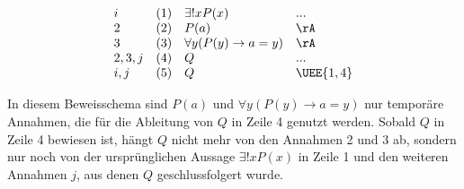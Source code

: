 \documentclass{book}
\theoremstyle{plain}
\theoremstyle{remark}
\theoremstyle{definition}
\begin{document}
\[
\begin{array}{llll}
    i      & (1) & \exists! x P(x)                                  & ...\\
    2      & (2) & P(a)                                             & \rA\\
    3      & (3) & \forall y (P(y) \rightarrow a = y)               & \rA\\
    2,3,j  & (4) & Q                                                & ...\\
    i,j    & (5) & Q                                                & \UEE{1,4}\\
\end{array}
\]

In diesem Beweisschema sind \(P(a)\) und \(\forall y (P(y) \rightarrow a = y)\) nur temporäre Annahmen, die für die Ableitung von \(Q\) in Zeile 4 genutzt werden. Sobald \(Q\) in Zeile 4 bewiesen ist, hängt \(Q\) nicht mehr von den Annahmen 2 und 3 ab, sondern nur noch von der ursprünglichen Aussage \(\exists! x P(x)\) in Zeile 1 und den weiteren Annahmen \(j\), aus denen \(Q\) geschlussfolgert wurde.
\end{document}
